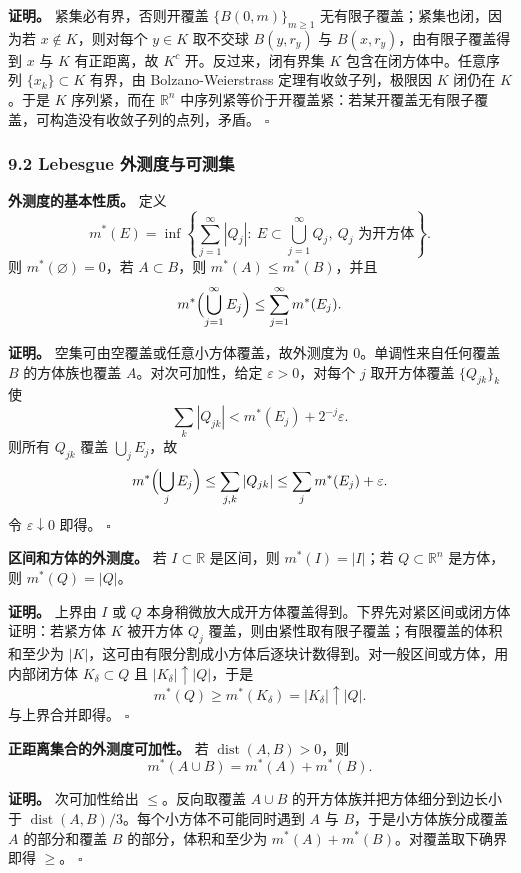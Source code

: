 \documentclass[
UTF8]{ctexart}
\newcommand{\impB}{\hspace{0.4em}{\small\textcolor{impBColor}{\textbf{[B 重要]}}}}
\newcommand{\thmlabel}[1]{\phantomsection\label{#1}}
\begin{document}
\textbf{证明。} 紧集必有界，否则开覆盖
\(\{B(0,m)\}_{m\ge1}\) 无有限子覆盖；紧集也闭，因为若 \(x\notin K\)，则对每个
\(y\in K\) 取不交球 \(B(y,r_y)\) 与 \(B(x,r_y)\)，由有限子覆盖得到 \(x\) 与
\(K\) 有正距离，故 \(K^c\) 开。反过来，闭有界集 \(K\) 包含在闭方体中。任意序列
\(\{x_k\}\subset K\) 有界，由 Bolzano-Weierstrass 定理有收敛子列，极限因
\(K\) 闭仍在 \(K\)。于是 \(K\) 序列紧，而在 \(\mathbb R^n\) 中序列紧等价于开覆盖紧：若某开覆盖无有限子覆盖，可构造没有收敛子列的点列，矛盾。 \(\square\)

\subsubsection{9.2 Lebesgue
外测度与可测集}\label{lebesgue-ux5916ux6d4bux5ea6ux4e0eux53efux6d4bux96c6ux8bc1ux660e}

\thmlabel{thm:outer-basic}\textbf{外测度的基本性质。}\impB
定义
\[
  m^*(E)=\inf\left\{\sum_{j=1}^{\infty}|Q_j|:\ E\subset\bigcup_{j=1}^{\infty}Q_j,\ Q_j
  \text{ 为开方体}\right\}.
\]
则 \(m^*(\varnothing)=0\)，若 \(A\subset B\)，则 \(m^*(A)\le m^*(B)\)，并且
\[
  m^*\Bigl(\bigcup_{j=1}^{\infty}E_j\Bigr)\le\sum_{j=1}^{\infty}m^*(E_j).
\]

\textbf{证明。} 空集可由空覆盖或任意小方体覆盖，故外测度为 \(0\)。单调性来自任何覆盖
\(B\) 的方体族也覆盖 \(A\)。对次可加性，给定 \(\varepsilon>0\)，对每个 \(j\) 取开方体覆盖
\(\{Q_{jk}\}_k\) 使
\[
  \sum_k |Q_{jk}|<m^*(E_j)+2^{-j}\varepsilon.
\]
则所有 \(Q_{jk}\) 覆盖 \(\bigcup_jE_j\)，故
\[
  m^*\Bigl(\bigcup_jE_j\Bigr)
  \le\sum_{j,k}|Q_{jk}|
  \le\sum_jm^*(E_j)+\varepsilon.
\]
令 \(\varepsilon\downarrow0\) 即得。 \(\square\)

\thmlabel{thm:cube-measure}\textbf{区间和方体的外测度。}\impB
若 \(I\subset\mathbb R\) 是区间，则 \(m^*(I)=|I|\)；若 \(Q\subset\mathbb R^n\)
是方体，则 \(m^*(Q)=|Q|\)。

\textbf{证明。} 上界由 \(I\) 或 \(Q\) 本身稍微放大成开方体覆盖得到。下界先对紧区间或闭方体证明：若紧方体
\(K\) 被开方体 \(Q_j\) 覆盖，则由紧性取有限子覆盖；有限覆盖的体积和至少为
\(|K|\)，这可由有限分割成小方体后逐块计数得到。对一般区间或方体，用内部闭方体
\(K_\delta\subset Q\) 且 \(|K_\delta|\uparrow |Q|\)，于是
\[
  m^*(Q)\ge m^*(K_\delta)=|K_\delta|\uparrow |Q|.
\]
与上界合并即得。 \(\square\)

\thmlabel{thm:positive-distance-additivity}\textbf{正距离集合的外测度可加性。}\impB
若 \(\operatorname{dist}(A,B)>0\)，则
\[
  m^*(A\cup B)=m^*(A)+m^*(B).
\]

\textbf{证明。} 次可加性给出 \(\le\)。反向取覆盖 \(A\cup B\) 的开方体族并把方体细分到边长小于
\(\operatorname{dist}(A,B)/3\)。每个小方体不可能同时遇到 \(A\) 与 \(B\)，于是小方体族分成覆盖
\(A\) 的部分和覆盖 \(B\) 的部分，体积和至少为 \(m^*(A)+m^*(B)\)。对覆盖取下确界即得
\(\ge\)。 \(\square\)
\end{document}
